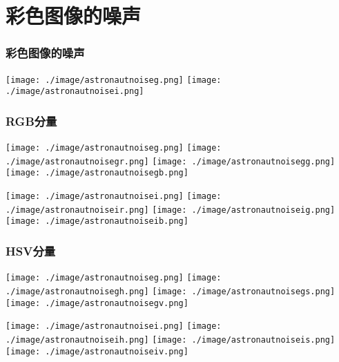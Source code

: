 \documentclass{beamer}
\begin{document}
\section{彩色图像的噪声}
\label{sec-8}
\begin{frame}
\frametitle{彩色图像的噪声}
\label{sec-8-1}

\texttt{[image: ./image/astronautnoiseg.png]}
\texttt{[image: ./image/astronautnoisei.png]}
\end{frame}
\begin{frame}
\frametitle{RGB分量}
\label{sec-8-2}

\texttt{[image: ./image/astronautnoiseg.png]}
\texttt{[image: ./image/astronautnoisegr.png]}
\texttt{[image: ./image/astronautnoisegg.png]}
\texttt{[image: ./image/astronautnoisegb.png]}

\texttt{[image: ./image/astronautnoisei.png]}
\texttt{[image: ./image/astronautnoiseir.png]}
\texttt{[image: ./image/astronautnoiseig.png]}
\texttt{[image: ./image/astronautnoiseib.png]}
\end{frame}
\begin{frame}
\frametitle{HSV分量}
\label{sec-8-3}

\texttt{[image: ./image/astronautnoiseg.png]}
\texttt{[image: ./image/astronautnoisegh.png]}
\texttt{[image: ./image/astronautnoisegs.png]}
\texttt{[image: ./image/astronautnoisegv.png]}

\texttt{[image: ./image/astronautnoisei.png]}
\texttt{[image: ./image/astronautnoiseih.png]}
\texttt{[image: ./image/astronautnoiseis.png]}
\texttt{[image: ./image/astronautnoiseiv.png]}
\end{frame}
\end{document}
